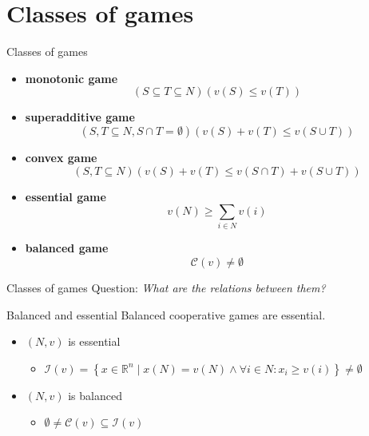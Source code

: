 \documentclass{beamer}
\newcommand{\R}{\mathbb{R}}
\begin{document}


\section{Classes of games}


\begin{frame}{Classes of games}
    \begin{itemize}
		\item<2-> \textbf{monotonic game} \[\left(S \subseteq T \subseteq N\right)\left(v(S) \leq v(T)\right)\]
		\item<3-> \textbf{superadditive game} \[\left(S,T \subseteq N, S \cap T = \emptyset\right)\left(v(S)+v(T) \leq v\left(S \cup T\right)\right)\]
		\item<4-> \textbf{convex game} \[\left(S,T \subseteq N\right)\left(v(S)+v(T) \leq v\left(S \cap T\right)+v\left(S \cup T\right)\right)\]
		\item<5-> \textbf{essential game} \[v(N) \geq \sum_{i \in N} v(i)\]
		\item<6-> \textbf{balanced game} \[\mathcal{C}(v) \neq \emptyset\]
	\end{itemize}
\end{frame}



\begin{frame}{Classes of games}
    Question: \textit{What are the relations between them?}
	\pause
	\begin{block}{Balanced and essential}
		Balanced cooperative games are essential.
	\end{block}
	\begin{itemize}
		\item<3-> $(N,v)$ is essential
		\begin{itemize}
			\item<4-> $\mathcal{I}(v)=\left\{x \in \R^n \mid x(N)=v(N)\land \forall i \in N: x_i \geq v(i)\right\} \neq \emptyset$
		\end{itemize}
		\item<5-> $(N,v)$ is balanced
		\begin{itemize}
			\item<6-> $\emptyset \neq \mathcal{C}(v) \subseteq \mathcal{I}(v)$
		\end{itemize}
	\end{itemize}
\end{frame}
\end{document}
